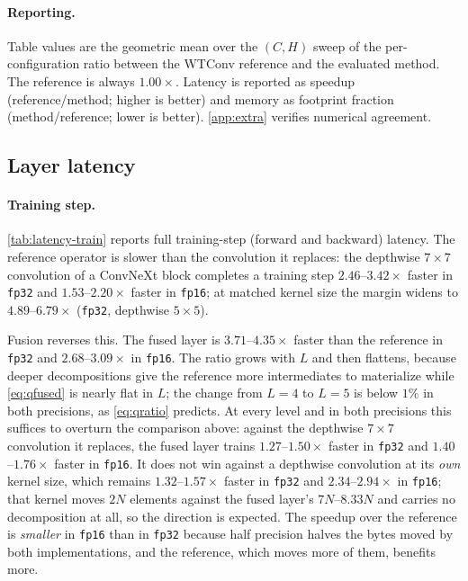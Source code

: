 \documentclass[10pt]{article} %
\theoremstyle{plain}
\begin{document}
\paragraph{Reporting.} Table values are the geometric mean over the $(C,H)$ sweep of the per-configuration ratio between the WTConv reference and the evaluated method. The reference is always $1.00\times$. Latency is reported as speedup (reference/method; higher is better) and memory as footprint fraction (method/reference; lower is better). \autoref{app:extra} verifies numerical agreement.
\subsection{Layer latency}
\label{sec:results-latency-train}

\paragraph{Training step.} \autoref{tab:latency-train} reports full training-step
(forward and backward) latency. The reference operator is slower than the convolution it
replaces: the depthwise $7\times7$ convolution of a ConvNeXt block completes a
training step $2.46$--$3.42\times$ faster in \texttt{fp32} and
$1.53$--$2.20\times$ faster in \texttt{fp16}; at matched kernel size the margin
widens to $4.89$--$6.79\times$ (\texttt{fp32}, depthwise $5\times5$).




Fusion reverses this. The fused layer is $3.71$--$4.35\times$ faster than the
reference in \texttt{fp32} and $2.68$--$3.09\times$ in \texttt{fp16}. The ratio
grows with $L$ and then flattens, because deeper decompositions give the reference
more intermediates to materialize while \autoref{eq:qfused} is nearly flat in $L$;
the change from $L{=}4$ to $L{=}5$ is below $1\%$ in both precisions, as
\autoref{eq:qratio} predicts. At every level and in both precisions this suffices
to overturn the comparison above: against the depthwise $7\times7$ convolution it
replaces, the fused layer trains $1.27$--$1.50\times$ faster in \texttt{fp32} and
$1.40$--$1.76\times$ faster in \texttt{fp16}. It does not win
against a depthwise convolution at its \emph{own} kernel size, which remains
$1.32$--$1.57\times$ faster in \texttt{fp32} and $2.34$--$2.94\times$ in
\texttt{fp16}; that kernel moves $2N$ elements against the fused layer's
$7N$--$8.33N$ and carries no decomposition at all, so the direction is expected.
The speedup over the reference is \emph{smaller} in \texttt{fp16}
than in \texttt{fp32} because half precision halves the bytes moved by both implementations,
and the reference, which moves more of them, benefits more.
\end{document}
